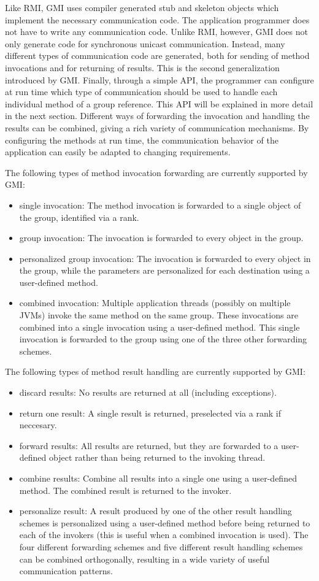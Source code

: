 \documentclass[10pt]{article}
\begin{document}
Like RMI, GMI uses compiler generated stub and skeleton objects which
implement the necessary communication code. The application programmer
does not have to write any communication code. Unlike RMI, however,
GMI does not only generate code for synchronous unicast
communication. Instead, many different types of communication code are
generated, both for sending of method invocations and for returning of
results. This is the second generalization introduced by GMI.
Finally, through a simple API, the programmer can configure at run
time which type of communication should be used to handle each
individual method of a group reference. This API will be explained in
more detail in the next section. Different ways of forwarding the
invocation and handling the results can be combined, giving a rich
variety of communication mechanisms. By configuring the methods at run
time, the communication behavior of the application can easily be
adapted to changing requirements.

The following types of method invocation forwarding are currently
supported by GMI:
\begin{itemize}
\item{single invocation:}
The method invocation is
forwarded to a single object of the group, identified via a rank.
\item{group invocation:}
The invocation is forwarded to every object in the
group.
\item{personalized group invocation:}
The invocation is forwarded to
every object in the group, while the parameters are personalized for
each destination using a user-defined method.
\item{combined invocation:}
Multiple application threads (possibly on multiple JVMs) invoke the
same method on the same group. These invocations are combined into a
single invocation using a user-defined method. This single invocation
is forwarded to the group using one of the three other forwarding
schemes.
\end{itemize}

The following types of method result handling are currently supported
by GMI:
\begin{itemize}
\item{discard results:}
No results are returned at all (including
exceptions).
\item{return one result:}
A single result is returned,
preselected via a rank if neccesary.
\item{forward results:}
All results are
returned, but they are forwarded to a user-defined object rather than
being returned to the invoking thread.
\item{combine results:}
Combine all
results into a single one using a user-defined method. The combined
result is returned to the invoker.
\item{personalize result:}
A result
produced by one of the other result handling schemes is personalized
using a user-defined method before being returned to each of the
invokers (this is useful when a combined invocation is used).  The
four different forwarding schemes and five different result handling
schemes can be combined orthogonally, resulting in a wide variety of
useful communication patterns.  
\end{itemize}
\end{document}
